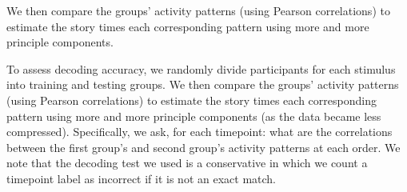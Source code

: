 \documentclass[english]{article}
\begin{document}
We then compare the groups’ activity patterns (using Pearson
correlations) to estimate the story times each corresponding pattern
using more and more principle components.   

To assess decoding accuracy, we randomly divide participants for each
stimulus into training and testing groups. We then compare the
groups’ activity patterns (using Pearson correlations) to estimate the
story times each corresponding pattern using more and more principle
components (as the data became less compressed). Specifically, we ask, for each timepoint: what are the correlations
between the first group's and second group's activity patterns at each
order. We note that the decoding test we used is a conservative in which we count a timepoint label as incorrect if it is not an exact match.










\end{document}
